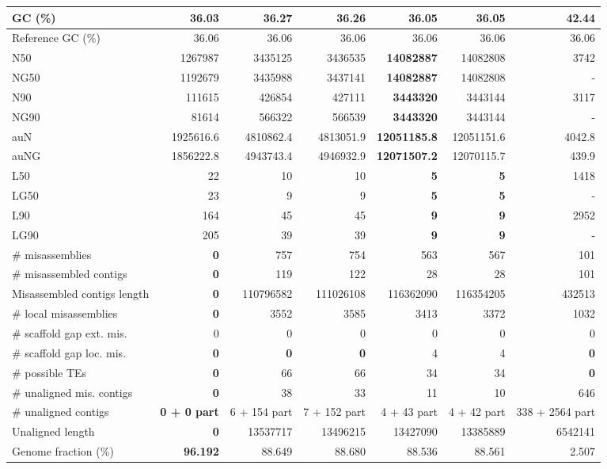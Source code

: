 \documentclass[12pt,a4paper]{article}
\begin{document}
\begin{table}[ht]
\begin{center}
\begin{tabular}{|l*{6}{|r}|}
GC (\%) & 36.03 & 36.27 & 36.26 & 36.05 & 36.05 & 42.44 \\ \hline
Reference GC (\%) & 36.06 & 36.06 & 36.06 & 36.06 & 36.06 & 36.06 \\ \hline
N50 & 1267987 & 3435125 & 3436535 & {\bf 14082887} & 14082808 & 3742 \\ \hline
NG50 & 1192679 & 3435988 & 3437141 & {\bf 14082887} & 14082808 & - \\ \hline
N90 & 111615 & 426854 & 427111 & {\bf 3443320} & 3443144 & 3117 \\ \hline
NG90 & 81614 & 566322 & 566539 & {\bf 3443320} & 3443144 & - \\ \hline
auN & 1925616.6 & 4810862.4 & 4813051.9 & {\bf 12051185.8} & 12051151.6 & 4042.8 \\ \hline
auNG & 1856222.8 & 4943743.4 & 4946932.9 & {\bf 12071507.2} & 12070115.7 & 439.9 \\ \hline
L50 & 22 & 10 & 10 & {\bf 5} & {\bf 5} & 1418 \\ \hline
LG50 & 23 & 9 & 9 & {\bf 5} & {\bf 5} & - \\ \hline
L90 & 164 & 45 & 45 & {\bf 9} & {\bf 9} & 2952 \\ \hline
LG90 & 205 & 39 & 39 & {\bf 9} & {\bf 9} & - \\ \hline
\# misassemblies & {\bf 0} & 757 & 754 & 563 & 567 & 101 \\ \hline
\# misassembled contigs & {\bf 0} & 119 & 122 & 28 & 28 & 101 \\ \hline
Misassembled contigs length & {\bf 0} & 110796582 & 111026108 & 116362090 & 116354205 & 432513 \\ \hline
\# local misassemblies & {\bf 0} & 3552 & 3585 & 3413 & 3372 & 1032 \\ \hline
\# scaffold gap ext. mis. & 0 & 0 & 0 & 0 & 0 & 0 \\ \hline
\# scaffold gap loc. mis. & {\bf 0} & {\bf 0} & {\bf 0} & 4 & 4 & {\bf 0} \\ \hline
\# possible TEs & {\bf 0} & 66 & 66 & 34 & 34 & {\bf 0} \\ \hline
\# unaligned mis. contigs & {\bf 0} & 38 & 33 & 11 & 10 & 646 \\ \hline
\# unaligned contigs & {\bf 0 + 0 part} & 6 + 154 part & 7 + 152 part & 4 + 43 part & 4 + 42 part & 338 + 2564 part \\ \hline
Unaligned length & {\bf 0} & 13537717 & 13496215 & 13427090 & 13385889 & 6542141 \\ \hline
Genome fraction (\%) & {\bf 96.192} & 88.649 & 88.680 & 88.536 & 88.561 & 2.507 \\ \hline

\end{tabular}
\end{center}
\end{table}
\end{document}
